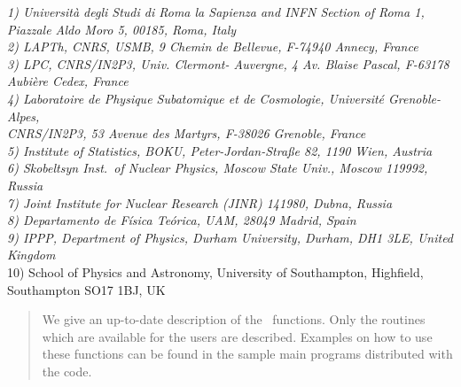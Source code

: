 \documentclass[12pt,a4paper]{article}
\begin{document}
{\it 
1) Universit\`a degli Studi di Roma la Sapienza and INFN Section of Roma 1,\\ Piazzale Aldo Moro 5, 00185, Roma, Italy\\
2) LAPTh, CNRS, USMB, 9 Chemin de Bellevue,  F-74940 Annecy, France\\
3) LPC, CNRS/IN2P3, Univ.  Clermont- Auvergne, 4 Av. Blaise Pascal, F-63178 Aubi\`ere Cedex,  France\\
4) {Laboratoire de Physique Subatomique et de Cosmologie}, Universit\'e Grenoble-Alpes,\\ CNRS/IN2P3, 53 Avenue des Martyrs, F-38026 Grenoble,  France\\
5) Institute of Statistics, BOKU, Peter-Jordan-Straße 82, 1190 Wien, Austria\\
6) Skobeltsyn Inst.\ of Nuclear Physics, Moscow State Univ., Moscow 119992, Russia\\
7) Joint Institute for Nuclear Research (JINR) 141980, Dubna,  Russia\\
8) Departamento de F\'isica Te\'orica, UAM, 28049 Madrid, Spain \\
9) IPPP, Department of Physics, Durham University, Durham, DH1 3LE,  United Kingdom}\\
10) School of Physics and Astronomy, University of Southampton, Highfield, Southampton SO17 1BJ, UK


\begin{abstract}
We give an up-to-date description of the \micro\ functions. Only the routines which are available for
the users are described.  Examples on how to use these functions
can be found in the sample main programs distributed with the code. 
\end{abstract}





\tableofcontents

\end{document}
